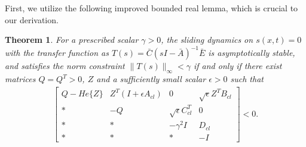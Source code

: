 \documentclass[journal,onecolumn]{IEEEtran}
\newtheorem{Thm}{Theorem}
\begin{document}
First, we utilize the following improved bounded real
lemma\cite{JiaYM}, which is crucial to our derivation.
 \begin{Thm}\label{thm1}  For a prescribed scalar $\gamma>0$, the
 sliding dynamics on $ s(x,t)=0 $ with the transfer function as $T(s)=\bar{C}(sI-\bar{A})^{-1}\bar{E}$
  is asymptotically stable, and
satisfies the norm constraint $\|T(s)\|_{\infty}<\gamma$ if and only
if there exist matrices $Q=Q^T>0$, $Z$ and a sufficiently small
scalar $\epsilon>0$ such that
\begin{equation}\begin{array}{l}
\label{Eq:thm 1 condition} \left[\begin{array}{ccccc}
Q-He\{Z\}&Z^T(I+\epsilon A_{cl}) &0&\sqrt{\epsilon}Z^TB_{cl}\\{*}&-Q&\sqrt{\epsilon}C_{cl}^T&0\\
{*}&{*}&-\gamma^2 I&D_{cl}
\\
{*}&{*}&{*}& - I
\end{array}\right]<0.\end{array}
\end{equation}
 \end{Thm}
\end{document}
